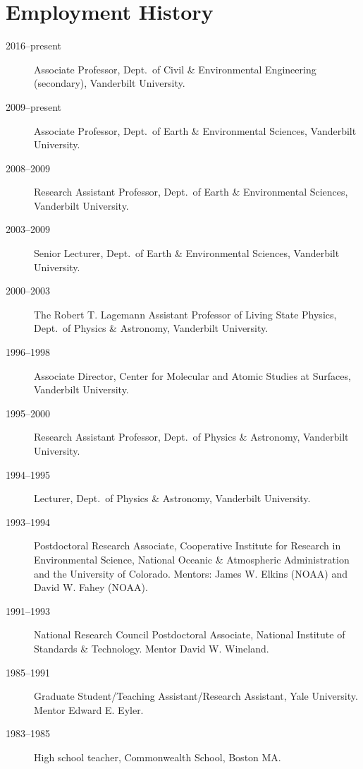 \documentclass[10pt]{article}
\begin{document}
\section{Employment History}
\begin{description}
\item[2016--present] Associate Professor, Dept.\ of Civil \& Environmental Engineering (secondary), Vanderbilt University.
\item[2009--present] Associate Professor, Dept.\ of Earth \& Environmental Sciences, Vanderbilt University.
\item[2008--2009] Research Assistant Professor, Dept.\ of Earth \& Environmental Sciences, Vanderbilt University.
\item[2003--2009] Senior Lecturer, Dept.\ of Earth \& Environmental Sciences, Vanderbilt University.
\item[2000--2003] The Robert T. Lagemann Assistant Professor of Living State Physics, Dept.\ of Physics \& Astronomy, Vanderbilt University.
\item[1996--1998] Associate Director, Center for Molecular and Atomic Studies at Surfaces, Vanderbilt University.
\item[1995--2000] Research Assistant Professor, Dept.\ of Physics \& Astronomy, Vanderbilt University.
\item[1994--1995] Lecturer, Dept.\ of Physics \& Astronomy, Vanderbilt University.
\item[1993--1994] Postdoctoral Research Associate, Cooperative Institute for Research in Environmental Science, National Oceanic \& Atmospheric Administration and the University of Colorado. Mentors: James W. Elkins (NOAA) and David W. Fahey (NOAA).
\item[1991--1993] National Research Council Postdoctoral Associate, National Institute of Standards \& Technology. Mentor David W. Wineland.
\item[1985--1991] Graduate Student/Teaching Assistant/Research Assistant, Yale University. Mentor Edward E. Eyler.
\item[1983--1985] High school teacher, Commonwealth School, Boston MA.
\end{description}
\end{document}
